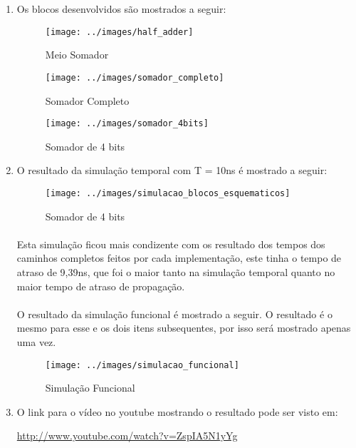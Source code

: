 \begin{enumerate}[label=(\alph*)]
\item Os blocos desenvolvidos são mostrados a seguir:
\begin{figure}[H]
    \centering
    \texttt{[image: ../images/half\_adder]}
    \caption{Meio Somador}
\end{figure}

\begin{figure}[H]
    \centering
    \texttt{[image: ../images/somador\_completo]}
    \caption{Somador Completo}
\end{figure}

\begin{figure}[H]
    \centering
    \texttt{[image: ../images/somador\_4bits]}
    \caption{Somador de 4 bits}
\end{figure}


\item O resultado da simulação temporal com T = 10ns é mostrado a seguir:
\begin{figure}[H]
    \centering
    \texttt{[image: ../images/simulacao\_blocos\_esquematicos]}
    \caption{Somador de 4 bits}
\end{figure}

\paragraph{}Esta simulação ficou mais condizente com os resultado dos tempos dos caminhos completos feitos por cada implementação, este tinha o tempo de atraso de 9,39ns, que foi o maior tanto na simulação temporal quanto no maior tempo de atraso de propagação.

\paragraph{} O resultado da simulação funcional é mostrado a seguir. O resultado é o mesmo para
esse e os dois itens subsequentes, por isso será mostrado apenas uma vez.
\begin{figure}[H]
    \centering
    \texttt{[image: ../images/simulacao\_funcional]}
    \caption{Simulação Funcional}
\end{figure}


\item
O link para o vídeo no youtube mostrando o resultado pode ser visto em:


\url{http://www.youtube.com/watch?v=ZspIA5N1yYg}
\end{enumerate}
